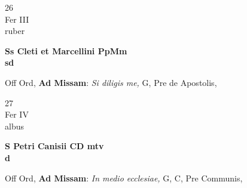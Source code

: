 \documentclass[10pt, openany]{book}
\begin{document}
        \begin{center}
            \begin{minipage}{3.5in}
                \vspace{2em}
                \begin{minipage}{0.5in}
                    {\Huge 26} \\
                    {\normalsize Fer III} \\
                    {\normalsize ruber}
                \end{minipage}
                \begin{minipage}{3.0in}
                    \textbf{ \large Ss Cleti et Marcellini PpMm \\
                    \textnormal{\normalsize sd}} \\ 
                \end{minipage}
                \begin{justify}Off Ord, \textbf{Ad Missam}: \textit{Si diligis me,} G, Pre de Apostolis,   
                \end{justify}
            \end{minipage}
        \end{center}
    
        \begin{center}
            \begin{minipage}{3.5in}
                \vspace{2em}
                \begin{minipage}{0.5in}
                    {\Huge 27} \\
                    {\normalsize Fer IV} \\
                    {\normalsize albus}
                \end{minipage}
                \begin{minipage}{3.0in}
                    \textbf{ \large S Petri Canisii CD mtv \\
                    \textnormal{\normalsize d}} \\ 
                \end{minipage}
                \begin{justify}Off Ord, \textbf{Ad Missam}: \textit{In medio ecclesiae,} G, C, Pre Communis,   
                \end{justify}
            \end{minipage}
        \end{center}
    
\end{document}
